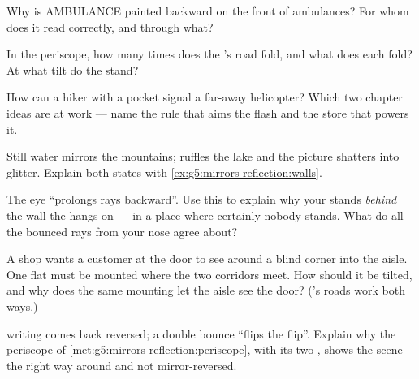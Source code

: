 \begin{exercise}[$\star$]\label{exo:g5:mirrors-reflection:5}
Why is AMBULANCE painted backward on the front of ambulances? For
whom does it read correctly, and through what?
\end{exercise}

\begin{exercise}[$\star$]\label{exo:g5:mirrors-reflection:6}
In the periscope, how many times does the 's road fold, and
what does each fold? At what tilt do the  stand?
\end{exercise}

\begin{exercise}[$\star$]\label{exo:g5:mirrors-reflection:7}
How can a hiker with a pocket  signal a far-away helicopter?
Which two chapter ideas are at work --- name the rule that aims
the flash and the store that powers it.
\end{exercise}

\begin{exercise}[$\star$]\label{exo:g5:mirrors-reflection:8}
Still water mirrors the mountains;  ruffles the lake and the
picture shatters into glitter. Explain both states with
\cref{ex:g5:mirrors-reflection:walls}.
\end{exercise}

\begin{exercise}[$\star\star$]\label{exo:g5:mirrors-reflection:9}
The eye ``prolongs rays backward''. Use this to explain why your
 stands \emph{behind} the wall the  hangs on --- in a
place where certainly nobody stands. What do all the bounced rays
from your nose agree about?
\end{exercise}

\begin{exercise}[$\star\star$]\label{exo:g5:mirrors-reflection:10}
A shop wants a customer at the door to see around a blind corner
into the aisle. One flat  must be mounted where the two
corridors meet. How should it be tilted, and why does the same
mounting let the aisle see the door? ('s roads work both
ways.)
\end{exercise}

\begin{exercise}[$\star\star$]\label{exo:g5:mirrors-reflection:11}
 writing comes back reversed; a double bounce ``flips the
flip''. Explain why the periscope of
\cref{met:g5:mirrors-reflection:periscope}, with its two ,
shows the scene the right way around and not mirror-reversed.
\end{exercise}
